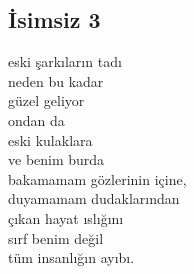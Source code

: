 \subsection{İsimsiz 3}

eski şarkıların tadı \\
neden bu kadar \\
güzel geliyor \\
ondan da \\
eski kulaklara \\

\noindent\newline
ve benim burda \\
bakamamam gözlerinin içine, \\
duyamamam dudaklarından \\
çıkan hayat ıslığını \\
sırf benim değil \\
tüm insanlığın ayıbı. \\